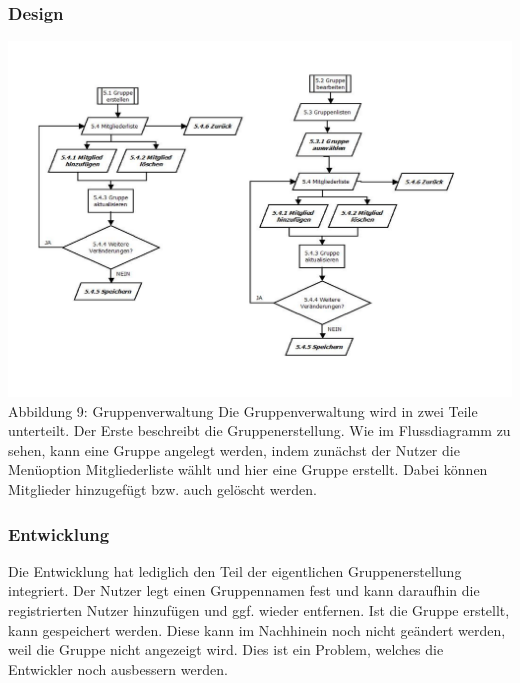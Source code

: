 \documentclass[12pt,a4paper]{article}
\begin{document}
\subsubsection*{Design}
\hspace*{-10mm} 
\includegraphics[trim=10mm 20mm 0mm 20mm,clip, scale=0.7]{Gruppenverwaltung.pdf}
\\
\footnotesize Abbildung 9: Gruppenverwaltung
\normalsize
\newline
\newline
Die Gruppenverwaltung wird in zwei Teile unterteilt. Der Erste beschreibt die Gruppenerstellung. Wie im Flussdiagramm zu sehen, kann eine Gruppe angelegt werden, indem zunächst der Nutzer die Menüoption Mitgliederliste wählt und hier eine Gruppe erstellt. Dabei können Mitglieder hinzugefügt bzw. auch gelöscht werden.
\subsubsection*{Entwicklung}
Die Entwicklung hat lediglich den Teil der eigentlichen Gruppenerstellung integriert. Der Nutzer legt einen Gruppennamen fest und kann daraufhin die registrierten Nutzer hinzufügen und ggf. wieder entfernen. Ist die Gruppe erstellt, kann gespeichert werden.
Diese kann im Nachhinein noch nicht geändert werden, weil die Gruppe nicht angezeigt wird. Dies ist ein Problem, welches die Entwickler noch ausbessern werden.
\newpage
\end{document}
